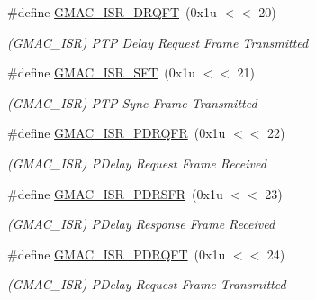 \begin{DoxyCompactItemize}
\mbox{\label{group__SAME70__GMAC_ga72aa98c9908c8fee8c02679b7b3f5262}} 
\#define \mbox{\hyperlink{group__SAME70__GMAC_ga72aa98c9908c8fee8c02679b7b3f5262}{G\+M\+A\+C\+\_\+\+I\+S\+R\+\_\+\+D\+R\+Q\+FT}}~(0x1u $<$$<$ 20)
\begin{DoxyCompactList}\small\item\em (G\+M\+A\+C\+\_\+\+I\+SR) P\+TP Delay Request Frame Transmitted \end{DoxyCompactList}\item 
\mbox{\label{group__SAME70__GMAC_gae7d51caf15513ee214a14ba37748199e}} 
\#define \mbox{\hyperlink{group__SAME70__GMAC_gae7d51caf15513ee214a14ba37748199e}{G\+M\+A\+C\+\_\+\+I\+S\+R\+\_\+\+S\+FT}}~(0x1u $<$$<$ 21)
\begin{DoxyCompactList}\small\item\em (G\+M\+A\+C\+\_\+\+I\+SR) P\+TP Sync Frame Transmitted \end{DoxyCompactList}\item 
\mbox{\label{group__SAME70__GMAC_gab0db5e6e685099758670df64e457c2b3}} 
\#define \mbox{\hyperlink{group__SAME70__GMAC_gab0db5e6e685099758670df64e457c2b3}{G\+M\+A\+C\+\_\+\+I\+S\+R\+\_\+\+P\+D\+R\+Q\+FR}}~(0x1u $<$$<$ 22)
\begin{DoxyCompactList}\small\item\em (G\+M\+A\+C\+\_\+\+I\+SR) P\+Delay Request Frame Received \end{DoxyCompactList}\item 
\mbox{\label{group__SAME70__GMAC_gac93e3450831a6861dd32ce882d30a61a}} 
\#define \mbox{\hyperlink{group__SAME70__GMAC_gac93e3450831a6861dd32ce882d30a61a}{G\+M\+A\+C\+\_\+\+I\+S\+R\+\_\+\+P\+D\+R\+S\+FR}}~(0x1u $<$$<$ 23)
\begin{DoxyCompactList}\small\item\em (G\+M\+A\+C\+\_\+\+I\+SR) P\+Delay Response Frame Received \end{DoxyCompactList}\item 
\mbox{\label{group__SAME70__GMAC_ga210babaa9a95b880413117cef1b29885}} 
\#define \mbox{\hyperlink{group__SAME70__GMAC_ga210babaa9a95b880413117cef1b29885}{G\+M\+A\+C\+\_\+\+I\+S\+R\+\_\+\+P\+D\+R\+Q\+FT}}~(0x1u $<$$<$ 24)
\begin{DoxyCompactList}\small\item\em (G\+M\+A\+C\+\_\+\+I\+SR) P\+Delay Request Frame Transmitted \end{DoxyCompactList}\item 
$$
\end{DoxyCompactItemize}
